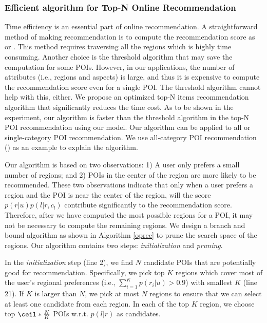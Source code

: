 \subsubsection{Efficient algorithm for Top-N Online Recommendation}
Time efficiency is an essential part of online recommendation. A straightforward
method of making recommendation is to compute the recommendation score as 
or .
This method requires traversing all the regions which is highly time consuming.
Another choice is the threshold algorithm \cite{FaginTA:2001}
that may save the computation for some POIs.
However, in our applications, the
number of attributes (i.e., regions and aspects) is large, and thus it is expensive
to compute the recommendation score even for a single POI.
The threshold algorithm cannot help with this, either.
We propose an optimized top-N items recommendation algorithm that significantly
reduces the time cost. As to be shown in the experiment,
our algorithm is faster than the threshold algorithm
in the top-N POI recommendation using our model. Our algorithm
can be applied to all or single-category POI recommendation. %
We use all-category POI recommendation ()
as an example to explain the algorithm.

Our algorithm is based on two observations:
1) A user only prefers a small number of regions;
and 2) POIs in the center of the
region are more likely to be recommended. These two observations indicate that only when
a user prefers a region and the POI is near the center of the region, will the score
$p(r|u)p(l|r,c_l)$
contribute significantly to the recommendation score.
Therefore, after we have computed the most possible regions for a POI,
it may not be necessary to compute the remaining regions.
We design a branch and bound algorithm as shown in Algorithm \ref{oprec}
to prune the search space of the regions.
Our algorithm contains two steps: \emph{initialization} and \emph{pruning}.

In the \emph{initialization} step (line 2),
we find $N$ candidate POIs that are potentially
good for recommendation.
Specifically, we pick top $K$ regions which
cover most of the user's regional preferences
(i.e., $\sum_{i=1}^{K}{p(r_i|u)}>0.9$) with smallest $K$ (line 21).
If $K$ is larger than $N$, we pick at most $N$ regions
to ensure that we can select at least one candidate from each region.
In each of the top $K$ region, we choose top $\ceil*{\frac{N}{K}}$
POIs w.r.t. $p(l|r)$ as candidates.

